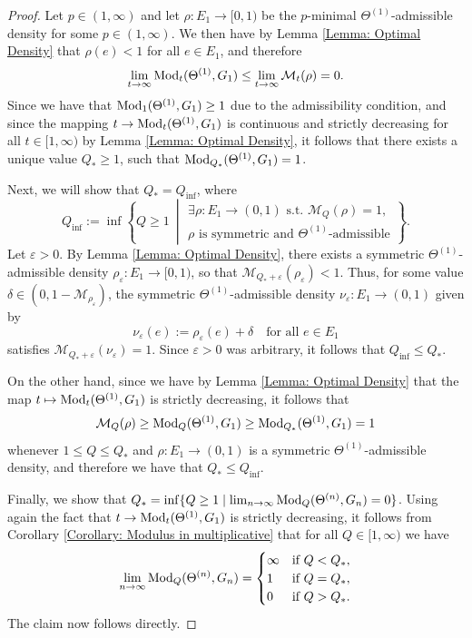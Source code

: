 \documentclass{amsart}
\newcommand{\Mod}{{\rm Mod}}
\numberwithin{equation}{section}
\theoremstyle{definition}
\theoremstyle{remark}
\newcommand{\cM}{\mathcal{M}}
\begin{document}
\begin{proof}
    Let $p\in (1,\infty)$ and let \(\rho\colon E_1\to [0,1)\) be the \(p\)-minimal \(\Theta^{(1)}\)-admissible density for some \(p\in(1,\infty)\). We then have by Lemma \ref{Lemma: Optimal Density} that \(\rho(e)<1\) for all \(e\in E_1\), and therefore
        \[
            \lim_{t\to\infty}\Mod_t(\Theta^{(1)},G_1)\leq \lim_{t\to\infty}\cM_t(\rho)=0.
        \]
    Since we have that \(\Mod_1(\Theta^{(1)},G_1)\geq 1\) due to the admissibility condition, and since the mapping \(t\to\Mod_t(\Theta^{(1)},G_1)\) is continuous and strictly decreasing for all \(t\in [1,\infty)\) by Lemma \ref{Lemma: Optimal Density}, it follows that there exists a unique value \(Q_*\geq 1\), such that \(\Mod_{Q_*}(\Theta^{(1)},G_1)=1\). 
    
    Next, we will show that \(Q_*=Q_{\inf}\), where
        \[
            Q_{\inf}:=\inf
            \left\{
                Q\geq1\ \middle\vert
                \begin{array}{l}
                    \exists \rho\colon E_1\to(0,1) \text{ s.t. } \cM_Q(\rho)=1,\\ \rho \text{ is symmetric and }\Theta^{(1)}\text{-admissible}
                \end{array}
            \right\}.
        \]
    Let \(\varepsilon>0\). By Lemma \ref{Lemma: Optimal Density}, there exists a symmetric \(\Theta^{(1)}\)-admissible density \(\rho_\varepsilon\colon E_1\to[0,1)\), so that \(\cM_{Q_*+\varepsilon}(\rho_\varepsilon)<1\). Thus, for some value \(\delta\in(0,1-\cM_{\rho_\varepsilon})\), the symmetric \(\Theta^{(1)}\)-admissible density \(\nu_\varepsilon\colon E_1\to(0,1)\) given by 
        \[
            \nu_\varepsilon(e):=\rho_\varepsilon(e)+\delta\quad\text{for all }e\in E_1
        \]
    satisfies \(\cM_{Q_*+\varepsilon}(\nu_\varepsilon)=1\). Since \(\varepsilon>0\) was arbitrary, it follows that \(Q_{\inf}\leq Q_*\). 
    
    On the other hand, since we have by Lemma \ref{Lemma: Optimal Density} that the map \(t\mapsto\Mod_t(\Theta^{(1)},G_1)\) is strictly decreasing, it follows that
        \[
            \cM_Q(\rho)\geq\Mod_Q(\Theta^{(1)},G_1)\geq \Mod_{Q_*}(\Theta^{(1)},G_1)=1
        \]
    whenever \(1\leq Q\leq Q_*\) and \(\rho\colon E_1\to (0,1)\) is a symmetric \(\Theta^{(1)}\)-admissible density, and therefore we have that \(Q_*\leq Q_{\inf}\).
    
    Finally, we show that \( Q_*=\inf\{Q\geq 1\mid \lim_{n\to\infty}\Mod_Q(\Theta^{(n)},G_n)=0\}\). Using again the fact that \(t\to\Mod_t(\Theta^{(1)},G_1)\) is strictly decreasing, it follows from Corollary \ref{Corollary: Modulus in multiplicative} that for all \(Q\in[1,\infty)\) we have
        \[
            \lim_{n\to\infty}\Mod_Q(\Theta^{(n)},G_n)=\begin{cases}
                \infty&\text{if }Q<Q_*,\\
                1&\text{if }Q=Q_*,\\
                0&\text{if }Q>Q_*.
            \end{cases}
        \]
    The claim now follows directly.
\end{proof}
\end{document}
